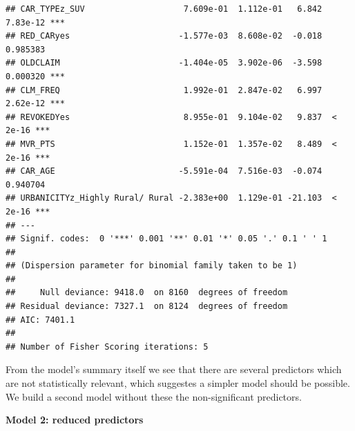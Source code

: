 \documentclass[]{article}
\begin{document}
\begin{verbatim}
## CAR_TYPEz_SUV                    7.609e-01  1.112e-01   6.842 7.83e-12 ***
## RED_CARyes                      -1.577e-03  8.608e-02  -0.018 0.985383    
## OLDCLAIM                        -1.404e-05  3.902e-06  -3.598 0.000320 ***
## CLM_FREQ                         1.992e-01  2.847e-02   6.997 2.62e-12 ***
## REVOKEDYes                       8.955e-01  9.104e-02   9.837  < 2e-16 ***
## MVR_PTS                          1.152e-01  1.357e-02   8.489  < 2e-16 ***
## CAR_AGE                         -5.591e-04  7.516e-03  -0.074 0.940704    
## URBANICITYz_Highly Rural/ Rural -2.383e+00  1.129e-01 -21.103  < 2e-16 ***
## ---
## Signif. codes:  0 '***' 0.001 '**' 0.01 '*' 0.05 '.' 0.1 ' ' 1
## 
## (Dispersion parameter for binomial family taken to be 1)
## 
##     Null deviance: 9418.0  on 8160  degrees of freedom
## Residual deviance: 7327.1  on 8124  degrees of freedom
## AIC: 7401.1
## 
## Number of Fisher Scoring iterations: 5
\end{verbatim}

From the model's summary itself we see that there are several predictors
which are not statistically relevant, which suggestes a simpler model
should be possible. We build a second model without these the
non-significant predictors.

\textbf{Model 2: reduced predictors}
\end{document}
